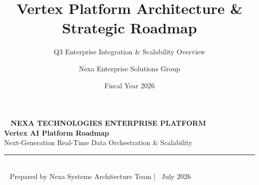 \documentclass[aspectratio=169, 10pt]{beamer}
\title[Vertex Platform Roadmap]{Vertex Platform Architecture \& Strategic Roadmap}
\subtitle{Q3 Enterprise Integration \& Scalability Overview}
\author[Nexa Technologies]{Nexa Enterprise Solutions Group}
\institute[Nexa Corp]{Nexa Technologies Inc.}
\date{Fiscal Year 2026}
\begin{document}
{
\makeatletter
{}
\makeatother
\begin{frame}[label=titleframe]
  \vspace*{0.2cm}
  \begin{center}
    \begin{tcolorbox}[
      enhanced,
      colback=NavyDark,
      colframe=NavyDark,
      arc=6pt,
      width=0.92\textwidth,
      halign=center,
      top=12pt, bottom=12pt
    ]
      \textcolor{SkyAccent}{\small\bfseries\faCogs~ NEXA TECHNOLOGIES ENTERPRISE PLATFORM}\\[6pt]
      {\huge\bfseries\color{white} Vertex AI Platform Roadmap}\\[6pt]
      {\large\color{PageBg!80!white} Next-Generation Real-Time Data Orchestration \& Scalability}\\[10pt]
      \rule{0.4\textwidth}{0.6pt}\\[10pt]
      {\small\color{white}\faUser~ Prepared by Nexa Systems Architecture Team \quad|\quad \faCalendar~ July 2026}
    \end{tcolorbox}

    \vspace*{0.2cm}
    \hyperlink{agenda}{} \quad
    \hyperlink{architecture}{} \quad
    \hyperlink{benchmarks}{}
  \end{center}
\end{frame}
}
\end{document}
